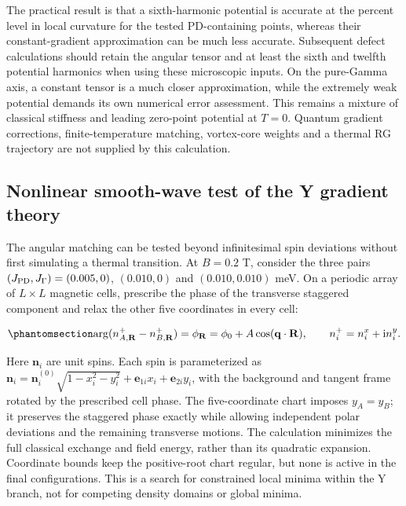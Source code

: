 The practical result is that a sixth-harmonic potential is accurate at
the percent level in local curvature for the tested PD-containing
points, whereas their constant-gradient approximation can be much less
accurate. Subsequent defect calculations should retain the angular
tensor and at least the sixth and twelfth potential harmonics when using
these microscopic inputs. On the pure-Gamma axis, a constant tensor is a
much closer approximation, while the extremely weak potential demands
its own numerical error assessment. This remains a mixture of classical
stiffness and leading zero-point potential at \(T=0\). Quantum gradient
corrections, finite-temperature matching, vortex-core weights and a
thermal RG trajectory are not supplied by this calculation.

\subsection{Nonlinear smooth-wave test of the Y gradient
theory}\label{sec-nbcp-y-nonlinear-gradient}

The angular matching can be tested beyond infinitesimal spin deviations
without first simulating a thermal transition. At \(B=0.2\) T, consider
the three pairs \((J_{\rm PD},J_\Gamma)=(0.005,0)\), \((0.010,0)\) and
\((0.010,0.010)\) meV. On a periodic array of \(L\times L\) magnetic
cells, prescribe the phase of the transverse staggered component and
relax the other five coordinates in every cell:

\begin{equation}\phantomsection\label{eq-nbcp-y-nonlinear-phase}{
\arg(n^+_{A,\mathbf R}-n^+_{B,\mathbf R})
=\phi_{\mathbf R}=\phi_0+A\cos(\mathbf q\cdot\mathbf R),
\qquad n_i^+=n_i^x+\mathrm i n_i^y.
}\end{equation}

Here \(\mathbf n_i\) are unit spins. Each spin is parameterized as
\(\mathbf n_i=\mathbf n_i^{(0)}\sqrt{1-x_i^2-y_i^2}+\mathbf e_{1i}x_i+\mathbf e_{2i}y_i\),
with the background and tangent frame rotated by the prescribed cell
phase. The five-coordinate chart imposes \(y_A=y_B\); it preserves the
staggered phase exactly while allowing independent polar deviations and
the remaining transverse motions. The calculation minimizes the full
classical exchange and field energy, rather than its quadratic
expansion. Coordinate bounds keep the positive-root chart regular, but
none is active in the final configurations. This is a search for
constrained local minima within the Y branch, not for competing density
domains or global minima.

